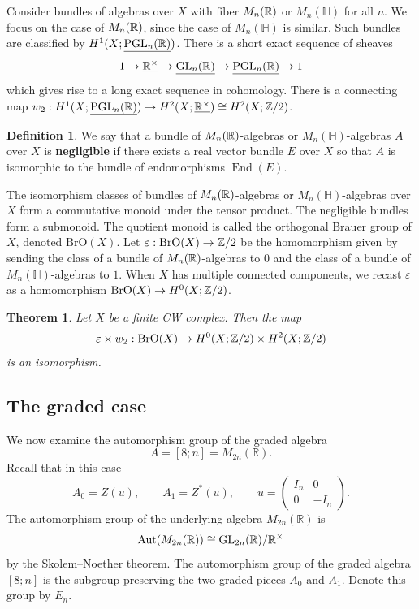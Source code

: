 \documentclass{amsart}
\DeclareMathOperator{\End}{End}
\numberwithin{equation}{section}
\theoremstyle{plain} %
\newtheorem{theorem}[equation]{Theorem}
\theoremstyle{definition}
\newtheorem{definition}[equation]{Definition}
\theoremstyle{remark}
\begin{document}
Consider bundles of algebras over $X$ with fiber $M_n(\mathbb{R})$ or $M_n(\mathbb{H})$ for all $n$. We focus on the case of $M_n(\mathbb{R})$, since the case of $M_n(\mathbb{H})$ is similar. Such bundles are classified by $H^1(X; \underline{\operatorname{PGL}_n(\mathbb{R})})$. There is a short exact sequence of sheaves \[1 \to \underline{\mathbb{R}^\times} \to \underline{\operatorname{GL}_n(\mathbb{R})} \to \underline{\operatorname{PGL}_n(\mathbb{R})} \to 1\] which gives rise to a long exact sequence in cohomology. There is a connecting map $w_2: H^1(X; \underline{\operatorname{PGL}_n(\mathbb{R})}) \to H^2(X; \underline{\mathbb{R}^\times}) \cong H^2(X; \mathbb{Z}/2)$.

\begin{definition}
    We say that a bundle of $M_n(\mathbb{R})$-algebras or $M_n(\mathbb{H})$-algebras $A$ over $X$ is \textbf{negligible} if there exists a real vector bundle $E$ over $X$ so that $A$ is isomorphic to the bundle of endomorphisms $\End(E)$.
\end{definition}

The isomorphism classes of bundles of $M_n(\mathbb{R})$-algebras or $M_n(\mathbb{H})$-algebras over $X$ form a commutative monoid under the tensor product. The negligible bundles form a submonoid. The quotient monoid is called the orthogonal Brauer group of $X$, denoted $\mathrm{BrO}(X)$. Let $\varepsilon: \mathrm{BrO}(X) \to \mathbb{Z}/2$ be the homomorphism given by sending the class of a bundle of $M_n(\mathbb{R})$-algebras to $0$ and the class of a bundle of $M_n(\mathbb{H})$-algebras to $1$. When $X$ has multiple connected components, we recast $\varepsilon$ as a homomorphism $\mathrm{BrO}(X) \to H^0(X; \mathbb{Z}/2)$.

\begin{theorem}
    Let $X$ be a finite CW complex. Then the map \[\varepsilon \times w_2: \mathrm{BrO}(X) \to H^0(X; \mathbb{Z}/2) \times H^2(X; \mathbb{Z}/2)\] is an isomorphism.
\end{theorem}

\subsection{The graded case}
We now examine the automorphism group of the graded algebra
\[
    A=[8;n]=M_{2n}(\mathbb R).
\]
Recall that in this case
\[
    A_0=Z(u),
    \qquad
    A_1=Z^*(u),
    \qquad
    u=
    \begin{pmatrix}
        I_n & 0\\
        0 & -I_n
    \end{pmatrix}.
\]
The automorphism group of the underlying algebra $M_{2n}(\mathbb R)$ is
\[
    \operatorname{Aut}(M_{2n}(\mathbb R))
    \cong \operatorname{GL}_{2n}(\mathbb R)/\mathbb R^\times
\]
by the Skolem--Noether theorem. The automorphism group of the graded algebra
$[8;n]$ is the subgroup preserving the two graded pieces $A_0$ and $A_1$.
Denote this group by $E_n$.
\end{document}
